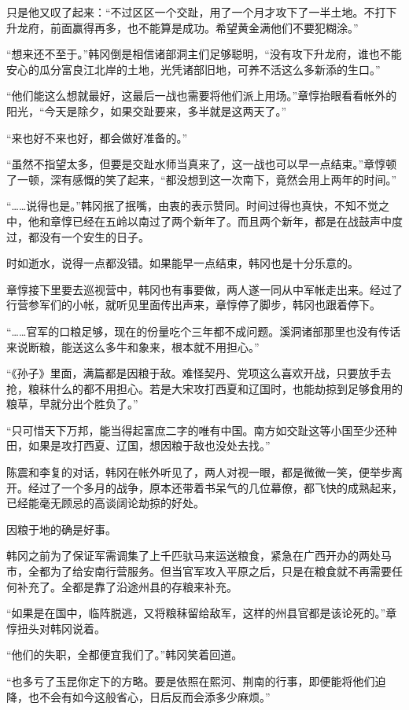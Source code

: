 只是他又叹了起来：“不过区区一个交趾，用了一个月才攻下了一半土地。不打下升龙府，前面赢得再多，也不能算是成功。希望黄金满他们不要犯糊涂。”

“想来还不至于。”韩冈倒是相信诸部洞主们足够聪明，“没有攻下升龙府，谁也不能安心的瓜分富良江北岸的土地，光凭诸部旧地，可养不活这么多新添的生口。”

“他们能这么想就最好，这最后一战也需要将他们派上用场。”章惇抬眼看看帐外的阳光，“今天是除夕，如果交趾要来，多半就是这两天了。”

“来也好不来也好，都会做好准备的。”

“虽然不指望太多，但要是交趾水师当真来了，这一战也可以早一点结束。”章惇顿了一顿，深有感慨的笑了起来，“都没想到这一次南下，竟然会用上两年的时间。”

“……说得也是。”韩冈抿了抿嘴，由衷的表示赞同。时间过得也真快，不知不觉之中，他和章惇已经在五岭以南过了两个新年了。而且两个新年，都是在战鼓声中度过，都没有一个安生的日子。

时如逝水，说得一点都没错。如果能早一点结束，韩冈也是十分乐意的。

章惇接下里要去巡视营中，韩冈也有事要做，两人遂一同从中军帐走出来。经过了行营参军们的小帐，就听见里面传出声来，章惇停了脚步，韩冈也跟着停下。

“……官军的口粮足够，现在的份量吃个三年都不成问题。溪洞诸部那里也没有传话来说断粮，能送这么多牛和象来，根本就不用担心。”

“《孙子》里面，满篇都是因粮于敌。难怪契丹、党项这么喜欢开战，只要放手去抢，粮秣什么的都不用担心。若是大宋攻打西夏和辽国时，也能劫掠到足够食用的粮草，早就分出个胜负了。”

“只可惜天下万邦，能当得起富庶二字的唯有中国。南方如交趾这等小国至少还种田，如果是攻打西夏、辽国，想因粮于敌也没处去找。”

陈震和李复的对话，韩冈在帐外听见了，两人对视一眼，都是微微一笑，便举步离开。经过了一个多月的战争，原本还带着书呆气的几位幕僚，都飞快的成熟起来，已经能毫无顾忌的高谈阔论劫掠的好处。

因粮于地的确是好事。

韩冈之前为了保证军需调集了上千匹驮马来运送粮食，紧急在广西开办的两处马市，全都为了给安南行营服务。但当官军攻入平原之后，只是在粮食就不再需要任何补充了。全都是靠了沿途州县的存粮来补充。

“如果是在国中，临阵脱逃，又将粮秣留给敌军，这样的州县官都是该论死的。”章惇扭头对韩冈说着。

“他们的失职，全都便宜我们了。”韩冈笑着回道。

“也多亏了玉昆你定下的方略。要是依照在熙河、荆南的行事，即便能将他们迫降，也不会有如今这般省心，日后反而会添多少麻烦。”

